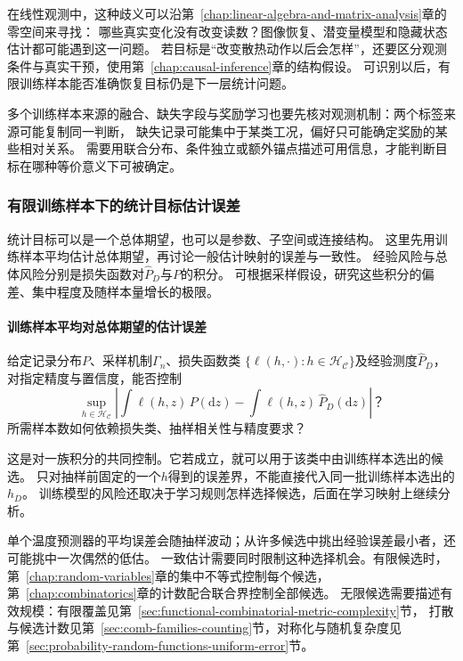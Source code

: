 在线性观测中，这种歧义可以沿第~\ref{chap:linear-algebra-and-matrix-analysis}章的零空间来寻找：
哪些真实变化没有改变读数？图像恢复、潜变量模型和隐藏状态估计都可能遇到这一问题。
若目标是“改变散热动作以后会怎样”，还要区分观测条件与真实干预，使用第~\ref{chap:causal-inference}章的结构假设。
可识别以后，有限训练样本能否准确恢复目标仍是下一层统计问题。

多个训练样本来源的融合、缺失字段与奖励学习也要先核对观测机制：两个标签来源可能复制同一判断，
缺失记录可能集中于某类工况，偏好只可能确定奖励的某些相对关系。
需要用联合分布、条件独立或额外锚点描述可用信息，才能判断目标在哪种等价意义下可被确定。

\subsubsection{有限训练样本下的统计目标估计误差}
\label{sec:future-analysis-generalization}

统计目标可以是一个总体期望，也可以是参数、子空间或连接结构。
这里先用训练样本平均估计总体期望，再讨论一般估计映射的误差与一致性。
经验风险与总体风险分别是损失函数对$\widehat P_D$与$P$的积分。
可根据采样假设，研究这些积分的偏差、集中程度及随样本量增长的极限。

\paragraph{训练样本平均对总体期望的估计误差}

\begin{mathproblem}[有限训练样本对总体泛函的近似]
  \label{question:future-generalization}
  给定记录分布$P$、采样机制$\Gamma_n$、损失函数类
  $\{\ell(h,\cdot):h\in\mathcal H_{\mathcal C}\}$及经验测度$\widehat P_D$，
  对指定精度与置信度，能否控制
  \[
    \sup_{h\in\mathcal H_{\mathcal C}}
      \left|\int\ell(h,z)\,P(\mathrm dz)
      -\int\ell(h,z)\,\widehat P_D(\mathrm dz)\right|\text{？}
  \]
  所需样本数如何依赖损失类、抽样相关性与精度要求？
\end{mathproblem}

这是对一族积分的共同控制。它若成立，就可以用于该类中由训练样本选出的候选。
只对抽样前固定的一个$h$得到的误差界，不能直接代入同一批训练样本选出的$h_D$。
训练模型的风险还取决于学习规则怎样选择候选，后面在学习映射上继续分析。

单个温度预测器的平均误差会随抽样波动；从许多候选中挑出经验误差最小者，还可能挑中一次偶然的低估。
一致估计需要同时限制这种选择机会。有限候选时，第~\ref{chap:random-variables}章的集中不等式控制每个候选，
第~\ref{chap:combinatorics}章的计数配合联合界控制全部候选。
无限候选需要描述有效规模：有限覆盖见第~\ref{sec:functional-combinatorial-metric-complexity}节，
打散与候选计数见第~\ref{sec:comb-families-counting}节，对称化与随机复杂度见第~\ref{sec:probability-random-functions-uniform-error}节。

